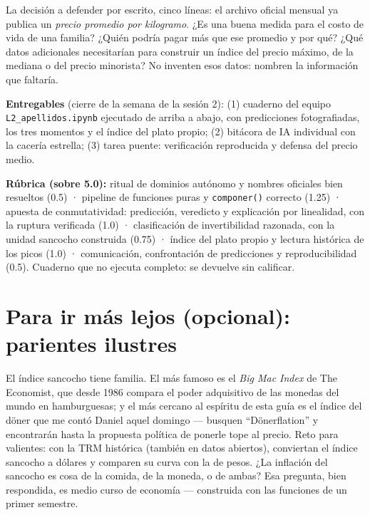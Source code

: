\documentclass[12pt,letterpaper]{article}
\begin{document}
La decisión a defender por escrito, cinco líneas: el archivo oficial mensual ya publica un \emph{precio promedio por kilogramo}. ¿Es una buena medida para el costo de vida de una familia? ¿Quién podría pagar más que ese promedio y por qué? ¿Qué datos adicionales necesitarían para construir un índice del precio máximo, de la mediana o del precio minorista? No inventen esos datos: nombren la información que faltaría.

\begin{cajaentrega}
\textbf{Entregables} (cierre de la semana de la sesión 2): (1) cuaderno del equipo \texttt{L2\_apellidos.ipynb} ejecutado de arriba a abajo, con predicciones fotografiadas, los tres momentos y el índice del plato propio; (2) bitácora de IA individual con la cacería estrella; (3) tarea puente: verificación reproducida y defensa del precio medio.

\textbf{Rúbrica (sobre 5.0):} ritual de dominios autónomo y nombres oficiales bien resueltos (0.5) · pipeline de funciones puras y \texttt{componer()} correcto (1.25) · apuesta de conmutatividad: predicción, veredicto y explicación por linealidad, con la ruptura verificada (1.0) · clasificación de invertibilidad razonada, con la unidad sancocho construida (0.75) · índice del plato propio y lectura histórica de los picos (1.0) · comunicación, confrontación de predicciones y reproducibilidad (0.5). Cuaderno que no ejecuta completo: se devuelve sin calificar.
\end{cajaentrega}

\section{Para ir más lejos (opcional): parientes ilustres}
El índice sancocho tiene familia. El más famoso es el \emph{Big Mac Index} de The Economist, que desde 1986 compara el poder adquisitivo de las monedas del mundo en hamburguesas; y el más cercano al espíritu de esta guía es el índice del döner que me contó Daniel aquel domingo --- busquen ``Dönerflation'' y encontrarán hasta la propuesta política de ponerle tope al precio. Reto para valientes: con la TRM histórica (también en datos abiertos), conviertan el índice sancocho a dólares y comparen su curva con la de pesos. ¿La inflación del sancocho es cosa de la comida, de la moneda, o de ambas? Esa pregunta, bien respondida, es medio curso de economía --- construida con las funciones de un primer semestre.
\end{document}
